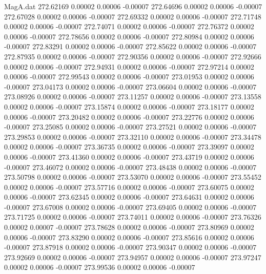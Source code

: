 \begin{filecontents}{MagA.dat}
 272.62169    0.00002    0.00006   -0.00007
 272.64696    0.00002    0.00006   -0.00007
 272.67028    0.00002    0.00006   -0.00007
 272.69332    0.00002    0.00006   -0.00007
 272.71748    0.00002    0.00006   -0.00007
 272.74071    0.00002    0.00006   -0.00007
 272.76372    0.00002    0.00006   -0.00007
 272.78656    0.00002    0.00006   -0.00007
 272.80984    0.00002    0.00006   -0.00007
 272.83291    0.00002    0.00006   -0.00007
 272.85622    0.00002    0.00006   -0.00007
 272.87935    0.00002    0.00006   -0.00007
 272.90356    0.00002    0.00006   -0.00007
 272.92666    0.00002    0.00006   -0.00007
 272.94931    0.00002    0.00006   -0.00007
 272.97214    0.00002    0.00006   -0.00007
 272.99543    0.00002    0.00006   -0.00007
 273.01953    0.00002    0.00006   -0.00007
 273.04173    0.00002    0.00006   -0.00007
 273.06604    0.00002    0.00006   -0.00007
 273.08926    0.00002    0.00006   -0.00007
 273.11257    0.00002    0.00006   -0.00007
 273.13558    0.00002    0.00006   -0.00007
 273.15874    0.00002    0.00006   -0.00007
 273.18177    0.00002    0.00006   -0.00007
 273.20482    0.00002    0.00006   -0.00007
 273.22776    0.00002    0.00006   -0.00007
 273.25085    0.00002    0.00006   -0.00007
 273.27521    0.00002    0.00006   -0.00007
 273.29853    0.00002    0.00006   -0.00007
 273.32110    0.00002    0.00006   -0.00007
 273.34478    0.00002    0.00006   -0.00007
 273.36735    0.00002    0.00006   -0.00007
 273.39097    0.00002    0.00006   -0.00007
 273.41360    0.00002    0.00006   -0.00007
 273.43719    0.00002    0.00006   -0.00007
 273.46072    0.00002    0.00006   -0.00007
 273.48438    0.00002    0.00006   -0.00007
 273.50798    0.00002    0.00006   -0.00007
 273.53070    0.00002    0.00006   -0.00007
 273.55452    0.00002    0.00006   -0.00007
 273.57716    0.00002    0.00006   -0.00007
 273.60075    0.00002    0.00006   -0.00007
 273.62345    0.00002    0.00006   -0.00007
 273.64631    0.00002    0.00006   -0.00007
 273.67008    0.00002    0.00006   -0.00007
 273.69405    0.00002    0.00006   -0.00007
 273.71725    0.00002    0.00006   -0.00007
 273.74011    0.00002    0.00006   -0.00007
 273.76326    0.00002    0.00007   -0.00007
 273.78628    0.00002    0.00006   -0.00007
 273.80969    0.00002    0.00006   -0.00007
 273.83290    0.00002    0.00006   -0.00007
 273.85616    0.00002    0.00006   -0.00007
 273.87918    0.00002    0.00006   -0.00007
 273.90347    0.00002    0.00006   -0.00007
 273.92669    0.00002    0.00006   -0.00007
 273.94957    0.00002    0.00006   -0.00007
 273.97247    0.00002    0.00006   -0.00007
 273.99536    0.00002    0.00006   -0.00007

\end{filecontents}

